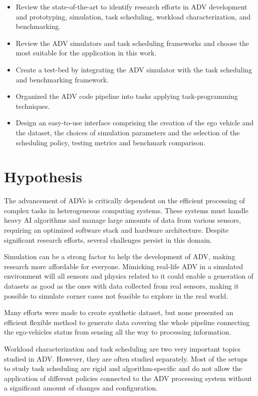 \begin{itemize}
	\item[a)] Review the state-of-the-art to identify research efforts in ADV development and prototyping, simulation, task scheduling, workload characterization, and benchmarking. 
    \item[b)] Review the ADV simulators and task scheduling frameworks and choose the most suitable for the application in this work.
    \item[c)] Create a test-bed by integrating the ADV simulator with the task scheduling and benchmarking framework.
	\item[d)] Organized the ADV code pipeline into tasks applying task-programming techniques.
	\item[e)] Design an easy-to-use interface comprising the creation of the ego vehicle and the dataset, the choices of simulation parameters and the selection of the scheduling policy, testing metrics and benchmark comparison.
\end{itemize}



\section{Hypothesis} \label{intro:hipoteses}
The advancement of ADVs is critically dependent on the efficient processing of complex tasks in heterogeneous computing systems. These systems must handle heavy AI algorithms and manage large amounts of data from various sensors, requiring an optimized software stack and hardware architecture. Despite significant research efforts, several challenges persist in this domain.

Simulation can be a strong factor to help the development of ADV, making research more affordable for everyone. Mimicking real-life ADV in a simulated environment will all sensors and physics related to it could enable a generation of datasets as good as the ones with data collected from real sensors, making it possible to simulate corner cases not feasible to explore in the real world. 

Many efforts were made to create synthetic dataset, but none presented an efficient flexible method to generate data covering the whole pipeline connecting the ego-vehicles status from sensing all the way to processing information.

Workload characterization and task scheduling are two very important topics studied in ADV. However, they are often studied separately. Most of the setups to study task scheduling are rigid and algorithm-specific and do not allow the application of different policies connected to the ADV processing system without a significant amount of changes and configuration. 

